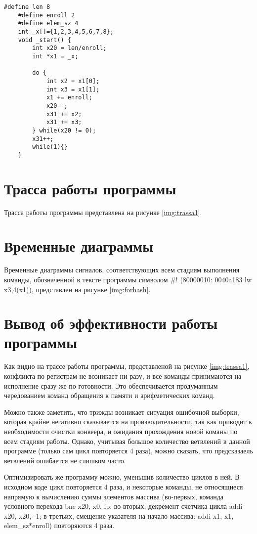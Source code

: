 \begin{lstlisting}[caption=Псевдокод программы,
	label={list_psevdo2}]
	#define len 8
	#define enroll 2
	#define elem_sz 4
	int _x[]={1,2,3,4,5,6,7,8};
	void _start() {
		int x20 = len/enroll;
		int *x1 = _x;
		
		do {
			int x2 = x1[0];
			int x3 = x1[1];
			x1 += enroll;
			x20--;
			x31 += x2;
			x31 += x3;
		} while(x20 != 0);
		x31++;
		while(1){}
	}
\end{lstlisting}

\section*{Трасса работы программы}

Трасса работы программы представлена на рисунке \ref{img:trassa1}.


\section*{Временные диаграммы}

Временные диаграммы сигналов, соответствующих всем стадиям выполнения команды, обозначенной в тексте программы символом \#! (80000010:	0040a183	lw x3,4(x1)), представлен на рисунке \ref{img:forhash}.



\section*{Вывод об эффективности работы программы}

Как видно на трассе работы программы, представленой на рисунке \ref{img:trassa1}, конфликта по регистрам не возникает ни разу, и все команды принимаются на исполнение сразу же по готовности. Это обеспечивается продуманным чередованием команд обращения к памяти и арифметических команд.

Можно также заметить, что трижды возникает ситуация ошибочной выборки, которая крайне негативно сказывается на производительности, так как приводит к необходимости очистки конвеера, и ожидания прохождения новой команы по всем стадиям работы. Однако, учитывая большое количество ветвлений в данной программе (только сам цикл повторяется 4 раза), можно сказать, что предсказаель ветвлений ошибается не слишком часто.

Оптимизировать же программу можно, уменьшив количество циклов в ней. В исходном коде цикл повторяется 4 раза, и некоторые команды, не относящиеся напрямую к вычислению суммы элементов массива (во-первых, команда условного перехода bne x20, x0, lp; во-вторых, декремент счетчика цикла addi x20, x20, -1; в-третьих, смещение указателя на начало массива: addi x1, x1, elem\_sz*enroll) повторяются 4 раза. 

